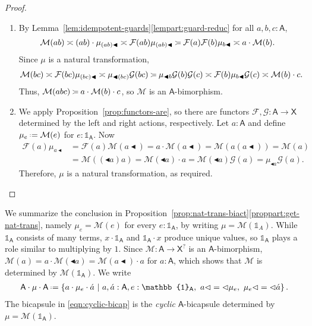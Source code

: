 \documentclass{amsart}
\newcommand{\tin}{:}
\newcommand{\Cat}[1]{\mathsf{#1}}
\newcommand{\cat}[1]{\Cat{#1}}
\newcommand{\acat}[1]{\mathsf{#1}}
\numberwithin{lstfloat}{section}
\newcommand{\srcfunc}{\mathbin{\blacktriangleleft}}
\newcommand{\tgtfunc}{\mathbin{\blacktriangleleft}}
\newcommand{\src}[1]{#1\srcfunc}
\newcommand{\tgt}[1]{\tgtfunc #1}
\newcommand{\one}{\mathbb{1}}
\newcommand{\defeq}{\mathrel{\hstretch{.13}{=}\hspace{.2ex}{=}}}
\newcommand{\func}[1]{\mathcal{#1}}
\newcommand{\fM}{\func{M}}
\newcommand{\cA}{\cat{A}}
\newcommand{\venturi}{%
  \mathrel{
    \begin{tikzpicture}[yscale=0.6,xscale=0.5]
        \draw (0ex,2.5ex) to (1ex,2ex);
        \draw (1ex,2ex) to (3ex,2ex);
        \draw (0ex,0.75ex) to (1ex,1.25ex);
        \draw (1ex,1.25ex) to (3ex,1.25ex);
    \end{tikzpicture}
  }
}
\newenvironment{iprf}{\begin{enumerate}[label=(\alph*), ref=(\alph*),
      labelwidth=-18pt, leftmargin=0pt, topsep=3pt, itemsep=2pt, parsep=2pt]}
      {\end{enumerate}}
\theoremstyle{definition}
\theoremstyle{remark}
\numberwithin{equation}{section}
\begin{document}
\begin{proof}
  \begin{iprf}
\item  By Lemma~\ref{lem:idempotent-guards}\ref{lempart:guard-reduc} for all $a,b,c\tin \acat{A}$,
  \begin{align*}
    \fM(ab)
    & \asymp (ab) \cdot \mu_{\src{(ab)}} \asymp \func{F}(ab)\mu_{\src{(ab)}}
    \venturi \func{F}(a)\func{F}(b)\mu_{\src{b}}
    \asymp a\cdot \fM(b) .
  \end{align*}
  Since $\mu$ is a
  natural transformation, 
  \begin{align*}
    \fM(bc)
    & \asymp \func{F}(bc)\mu_{\src{(bc)}} 
      \asymp \mu_{\tgt{(bc)}}\func{G}(bc) 
      \venturi \mu_{\tgt{b}}\func{G}(b)\func{G}(c) 
      \asymp \func{F}(b)\mu_{\src{b}}\func{G}(c) 
      \asymp \fM(b)\cdot c.
  \end{align*}\enlargethispage{0.3cm}
  Thus, $\fM(abc)\venturi a\cdot \fM(b)\cdot c$, so $\fM$ is an
  $\cA$-bimorphism.

  \item We apply Proposition~\ref{prop:functors-are}, so there are functors
  $\func{F},\func{G}:\acat{A}\to \acat{X}$ determined by the left and right
  actions, respectively. Let $a\tin\acat{A}$ and define
  $\mu_e\defeq\func{M}(e)$ for $e:\one_{\acat{A}}$. Now 
  \begin{align*}
    \func{F}(a) \mu_{\src{a}} &= \func{F}(a) \fM(\src{a}) = a\cdot \fM(\src{a}) = \fM(a(\src{a})) = \fM(a)\\
    &= \fM((\tgt{a})a) = \fM(\tgt{a})\cdot a = \fM(\tgt{a})\func{G}(a) = \mu_{\tgt{a}}\func{G}(a).
  \end{align*}
  Therefore, $\mu$ is a natural transformation, as required.\qedhere
  \end{iprf}
\end{proof}

We summarize the conclusion in
Proposition~\ref{prop:nat-trans-biact}\ref{proppart:get-nat-trans}, namely $\mu_e =
\fM(e)$ for every $e:\one_{\acat{A}}$, by writing $\mu=\mathcal{M}(\one_A)$.
While $\one_{\cA}$ consists of many terms, 
$x\cdot \one_{\cA}$
and $\one_{\cA}\cdot x$ produce unique values, so 
$\one_{\cA}$
plays a role similar
to multiplying by $1$. Since $\mathcal{M}:\acat{A}\to\acat{X}^?$ is an $\acat{A}$-bimorphism,  $\mathcal{M}(a)=a\cdot \mathcal{M}(\tgt{a})=\mathcal{M}(\src{a})\cdot a$ for $a:\acat{A}$, which shows that $\mathcal{M}$ is determined by $\mathcal{M}(\one_{\acat{A}})$. We 
write
\begin{align}\label{eqn:cyclic-bicap}
  \cA\cdot \mu \cdot \cA \defeq \left\{ a \cdot \mu_e \cdot \acute{a} ~\middle|~ a,\acute{a} 
  :\acat{A}, e:\one_{\acat{A}},\ a\lhd = \lhd \mu_{e},\ \mu_e \lhd = \lhd \acute{a} \right\}.
\end{align}
The bicapsule in \eqref{eqn:cyclic-bicap} is the \emph{cyclic}
$\acat{A}$-bicapsule determined by $\mu = \fM(\one_{\acat{A}})$.
\end{document}
